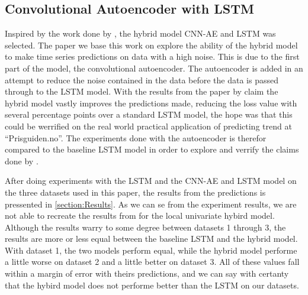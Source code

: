 
\subsection{Convolutional Autoencoder with LSTM}
\label{section:Discussion:Discussion:CNN-AE-LSTM}



Inspired by the work done by \cite{Zhao2019}, the hybrid model CNN-AE and LSTM was selected.
The paper we base this work on explore the ability of the hybrid model to make time series predictions
on data with a high noise.
This is due to the first part of the model, the convolutional autoencoder.
The autoencoder is added in an attempt to reduce the noise contained in the data before the data is passed through to the LSTM model.
With the results from the paper by \cite{Zhao2019} claim the hybrid model vastly improves the predictions made, reducing the loss value with
several percentage points over a standard LSTM model, the hope was that this could be werrified on the real world practical application of
predicting trend at ``Prisguiden.no''.
The experiments done with the autoencoder is therefor compared to the baseline LSTM model in order to explore and verrify the claims done by
\cite{Zhao2019}.


After doing experiments with the LSTM and the CNN-AE and LSTM model on the three datasets used in this paper,
the results from the predictions is pressented in \cref{section:Results}.
As we can se from the experiment results, we are not able to recreate the results from \cite{Zhao2019}
for the local univariate hybird model.
Although the results warry to some degree between datasets 1 through 3, the results are more or less equal between the baseline LSTM
and the hybrid model.
With dataset 1, the two models perform equal, while the hybrid model performe a little worse on dataset 2 and a little better on dataset 3.
All of these values fall within a margin of error with theirs predictions, and we can say with certanty that the hybird model does not performe
better than the LSTM on our datasets.  

